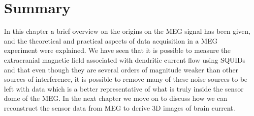 \section*{Summary}

In this chapter a brief overview on the origins on the MEG signal has been given, and the theoretical and practical aspects of data acquisition in a MEG experiment were explained. We have seen that it is possible to measure the extracranial magnetic field associated with dendritic current flow using SQUIDs and that even though they are several orders of magnitude weaker than other sources of interference, it is possible to remove many of these noise sources to be left with data which is a better representative of what is truly inside the sensor dome of the MEG. In the next chapter we move on to discuss how we can reconstruct the sensor data from MEG to derive 3D images of brain current.